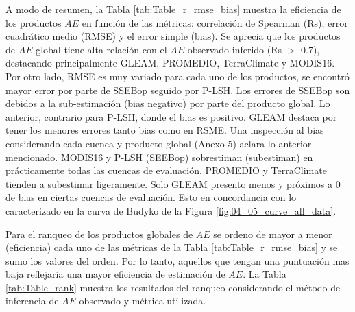 \documentclass[12pt]{article}
\begin{document}
A modo de resumen, la Tabla \ref{tab:Table_r_rmse_bias} muestra la eficiencia de los productos $AE$ en función de las métricas: correlación de Spearman (Rs), error cuadrático medio (RMSE) y el error simple (bias). Se aprecia que los productos de $AE$ global tiene alta relación con el $AE$ observado inferido (Rs $>$ 0.7), destacando principalmente GLEAM, PROMEDIO, TerraClimate y MODIS16. Por otro lado, RMSE es muy variado para cada uno de los productos, se encontró mayor error por parte de SSEBop seguido por P-LSH. Los errores de SSEBop son debidos a la sub-estimación (bias negativo) por parte del producto global. Lo anterior, contrario para P-LSH, donde el bias es positivo. GLEAM destaca por tener los menores errores tanto bias como en RSME. Una inspección al bias considerando cada cuenca y producto global (Anexo 5) aclara lo anterior mencionado. MODIS16 y P-LSH (SEEBop) sobrestiman (subestiman) en prácticamente todas las cuencas de evaluación. PROMEDIO y TerraClimate tienden a subestimar ligeramente. Solo GLEAM presento menos y próximos a 0 de bias en ciertas cuencas de evaluación. Esto en concordancia con lo caracterizado en la curva de Budyko de la Figura \ref{fig:04_05_curve_all_data}.



Para el ranqueo de los productos globales de $AE$ se ordeno de mayor a menor (eficiencia) cada uno de las métricas de la Tabla \ref{tab:Table_r_rmse_bias} y se sumo los valores del orden. Por lo tanto, aquellos que tengan una puntuación mas baja reflejaría una mayor eficiencia de estimación de $AE$. La Tabla \ref{tab:Table_rank} muestra los resultados del ranqueo considerando el método de inferencia de $AE$ observado y métrica utilizada. 



\thispagestyle{empty}
\end{document}
